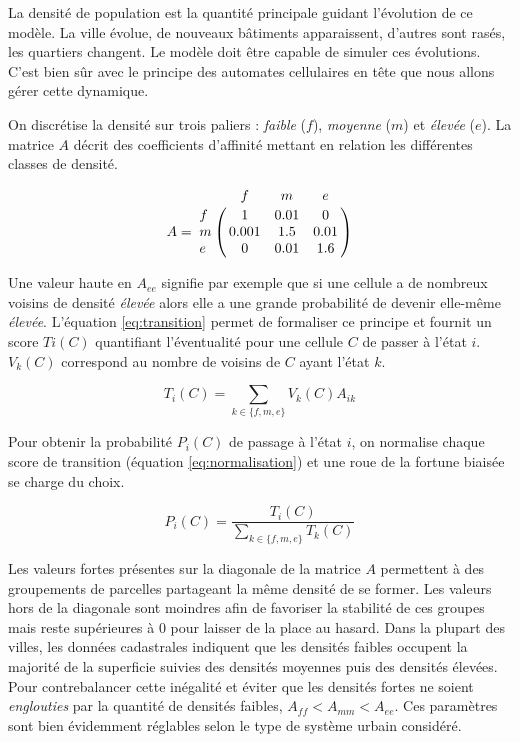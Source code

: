 \documentclass[10pt]{article}
\begin{document}
La densité de population est la quantité principale guidant
l'évolution de ce modèle. La ville évolue, de nouveaux bâtiments
apparaissent, d'autres sont rasés, les quartiers changent. Le modèle
doit être capable de simuler ces évolutions. C'est bien sûr avec le
principe des automates cellulaires en tête que nous allons gérer cette
dynamique.

On discrétise la densité sur trois paliers : \textit{faible} ($f$),
\textit{moyenne} ($m$) et \textit{élevée} ($e$). La matrice $A$ décrit
des coefficients d'affinité mettant en relation les différentes
classes de densité.

\begin{equation}
A =
\bordermatrix{
    & f & m & e \cr
  f & 1 & 0.01 & 0 \cr
  m & 0.001 & 1.5 & 0.01 \cr
  e & 0 & 0.01 & 1.6
}
\end{equation}

Une valeur haute en $A_{ee}$ signifie par exemple que si une cellule a
de nombreux voisins de densité \textit{élevée} alors elle a une grande
probabilité de devenir elle-même \textit{élevée}. L'équation
\ref{eq:transition} permet de formaliser ce principe et fournit un
score $Ti(C)$ quantifiant l'éventualité pour une cellule $C$ de passer
à l'état $i$. $V_k(C)$ correspond au nombre de voisins de $C$ ayant
l'état $k$.

\begin{equation}
T_i(C) = \sum_{k \in \{f,m,e\}} V_k(C) A_{ik}
\label{eq:transition}
\end{equation}

Pour obtenir la probabilité $P_i(C)$ de passage à l'état $i$, on
normalise chaque score de transition (équation \ref{eq:normalisation})
et une roue de la fortune biaisée se charge du choix.

\begin{equation}
P_i(C) = \frac{T_i(C)}{\sum_{k \in \{f,m,e\}} T_k(C)}
\label{eq:normalisation}
\end{equation}

Les valeurs fortes présentes sur la diagonale de la matrice $A$
permettent à des groupements de parcelles partageant la même densité
de se former. Les valeurs hors de la diagonale sont moindres afin de
favoriser la stabilité de ces groupes mais reste supérieures à 0 pour
laisser de la place au hasard. Dans la plupart des villes, les données
cadastrales indiquent que les densités faibles occupent la majorité de
la superficie suivies des densités moyennes puis des densités
élevées. Pour contrebalancer cette inégalité et éviter que les
densités fortes ne soient \textit{englouties} par la quantité de
densités faibles, $A_{ff} < A_{mm} < A_{ee}$. Ces paramètres sont bien
évidemment réglables selon le type de système urbain considéré.
\end{document}
